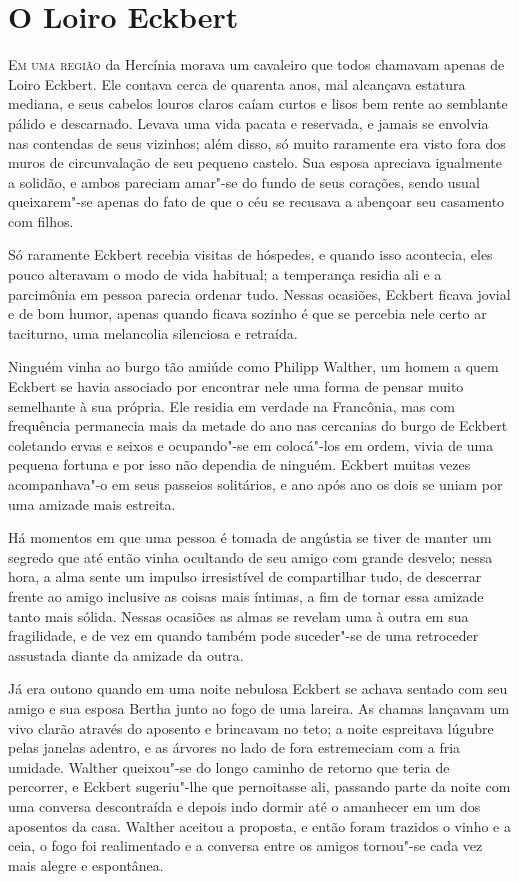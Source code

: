 


\chapter{O Loiro Eckbert}


\textsc{Em uma região} da Hercínia morava um cavaleiro que todos chamavam apenas
de Loiro Eckbert. Ele contava cerca de quarenta anos, mal alcançava
estatura mediana, e seus cabelos louros claros caíam curtos e lisos bem
rente ao semblante pálido e descarnado. Levava uma vida pacata e
reservada, e jamais se envolvia nas contendas de seus vizinhos; além
disso, só muito raramente era visto fora dos muros de circunvalação de
seu pequeno castelo. Sua esposa apreciava igualmente a solidão, e ambos
pareciam amar"-se do fundo de seus corações, sendo usual queixarem"-se
apenas do fato de que o céu se recusava a abençoar seu casamento com filhos.

 Só raramente Eckbert recebia visitas de hóspedes, e quando isso
acontecia, eles pouco alteravam o modo de vida habitual; a temperança
residia ali e a parcimônia em pessoa parecia ordenar tudo. Nessas
ocasiões, Eckbert ficava jovial e de bom humor, apenas quando ficava
sozinho é que se percebia nele certo ar taciturno, uma melancolia
silenciosa e retraída.

 Ninguém vinha ao burgo tão amiúde como Philipp Walther, um homem a quem
Eckbert se havia associado por encontrar nele uma forma de pensar muito
semelhante à sua própria. Ele residia em verdade na Francônia, mas com
frequência permanecia mais da metade do ano nas cercanias do burgo de
Eckbert coletando ervas e seixos e ocupando"-se em colocá"-los em ordem,
vivia de uma pequena fortuna e por isso não dependia de ninguém.
Eckbert muitas vezes acompanhava"-o em seus passeios solitários, 
e ano após ano os dois se uniam por uma amizade mais estreita.

 Há momentos em que uma pessoa é tomada de angústia se tiver de manter um
segredo que até então vinha ocultando de seu amigo com grande desvelo;
nessa hora, a alma sente um impulso irresistível de compartilhar tudo,
de descerrar frente ao amigo inclusive as coisas mais íntimas, a fim de
tornar essa amizade tanto mais sólida. Nessas ocasiões as almas se
revelam uma à outra em sua fragilidade, e de vez em quando também pode
suceder"-se de uma retroceder assustada diante da amizade da outra.

Já era outono quando em uma noite nebulosa Eckbert se achava sentado com
seu amigo e sua esposa Bertha junto ao fogo de uma lareira. As chamas
lançavam um vivo clarão através do aposento e brincavam no teto; a
noite espreitava lúgubre pelas janelas adentro, e as árvores no lado de
fora estremeciam com a fria umidade. Walther queixou"-se do longo
caminho de retorno que teria de percorrer, e Eckbert sugeriu"-lhe que
pernoitasse ali, passando parte da noite com uma conversa descontraída
e depois indo dormir até o amanhecer em um dos aposentos da casa.
Walther aceitou a proposta, e então foram trazidos o vinho e a ceia, o
fogo foi realimentado e a conversa entre os amigos tornou"-se 
cada vez mais alegre e espontânea.

